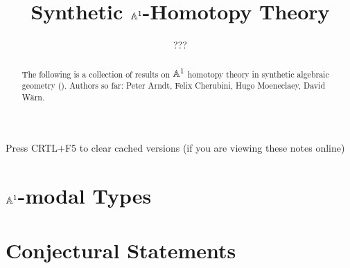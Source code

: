 \documentclass{../util/zariski}
\title{Synthetic $\mathbb{A}^1$-Homotopy Theory}
\author{???}
\begin{document}
\maketitle

\begin{center}
  \color{purple}
  \large{Press CRTL+F5 to clear cached versions}
  \large{(if you are viewing these notes online)}
\end{center}

\begin{abstract}
  The following is a collection of results on $\mathbb{A}^1$ homotopy theory in synthetic algebraic geometry (\cite{draft}).
  Authors so far: Peter Arndt, Felix Cherubini, Hugo Moeneclaey, David Wärn. 
\end{abstract}

\tableofcontents

\section{$\mathbb{A}^1$-modal Types}


\section{Conjectural Statements}


\printindex

\printbibliography
\end{document}

